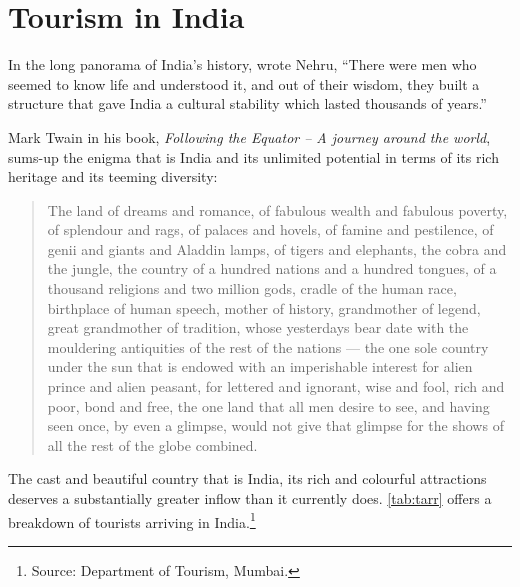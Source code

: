 \chapter{Tourism in India} %
\label{cha:tii}

In the long panorama of India's history, wrote Nehru, ``There were men who seemed to know life and understood it, and out of their wisdom, they built a structure that gave India a cultural stability which lasted thousands of years.''

Mark Twain in his book, \emph{Following the Equator -- A journey around the world}, sums-up the enigma that is India and its unlimited potential in terms of its rich heritage and its teeming diversity: 

\begin{quote}
  The land of dreams and romance, of fabulous wealth and fabulous poverty, of splendour and rags, of palaces and hovels, of famine and pestilence, of genii and giants and Aladdin lamps, of tigers and elephants, the cobra and the jungle, the country of a hundred nations and a hundred tongues, of a thousand religions and two million gods, cradle of the human race, birthplace of human speech, mother of history, grandmother of legend, great grandmother of tradition, whose yesterdays bear date with the mouldering antiquities of the rest of the nations --- the one sole country under the sun that is endowed with an imperishable interest for alien prince and alien peasant, for lettered and ignorant, wise and fool, rich and poor, bond and free, the one land that all men desire to see, and having seen once, by even a glimpse, would not give that glimpse for the shows of all the rest of the globe combined.
\end{quote}

\noindent The cast and beautiful country that is India, its rich and colourful attractions deserves a substantially greater inflow than it currently does. \autoref{tab:tarr} offers a breakdown of tourists arriving in India.\footnote{Source: Department of Tourism, Mumbai.}

